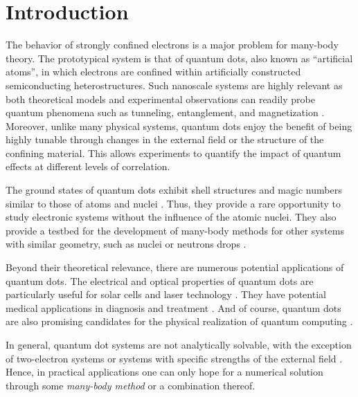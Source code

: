 \maketitle

\section{Introduction}

The behavior of strongly confined electrons is a major problem for many-body theory.  The prototypical system is that of quantum dots, also known as ``artificial atoms'', in which electrons are confined within artificially constructed semiconducting heterostructures.  Such nanoscale systems are highly relevant as both theoretical models and experimental observations can readily probe quantum phenomena such as tunneling, entanglement, and magnetization \cite{reimann2002,engel1993}.  Moreover, unlike many physical systems, quantum dots enjoy the benefit of being highly tunable through changes in the external field or the structure of the confining material.  This allows experiments to quantify the impact of quantum effects at different levels of correlation.

The ground states of quantum dots exhibit shell structures and magic numbers similar to those of atoms and nuclei \cite{tarucha1996}.  Thus, they provide a rare opportunity to study electronic systems without the influence of the atomic nuclei.  They also provide a testbed for the development of many-body methods for other systems with similar geometry, such as nuclei or neutrons drops \cite{PhysRevC.84.044306}.

Beyond their theoretical relevance, there are numerous potential applications of quantum dots.  The electrical and optical properties of quantum dots are particularly useful for solar cells \cite{jenks:013111,doi:10.1021/cr900289f} and laser technology \cite{strauf2010,5075760}.  They have potential medical applications in diagnosis and treatment \cite{Ben-Ari02042003}.  And of course, quantum dots are also promising candidates for the physical realization of quantum computing \cite{PhysRevA.57.120}.

In general, quantum dot systems are not analytically solvable, with the exception of two-electron systems or systems with specific strengths of the external field \cite{PhysRevA.48.3561,10.1088/0305-4470/27/3/040}.  Hence, in practical applications one can only hope for a numerical solution through some \textit{many-body method} or a combination thereof.

